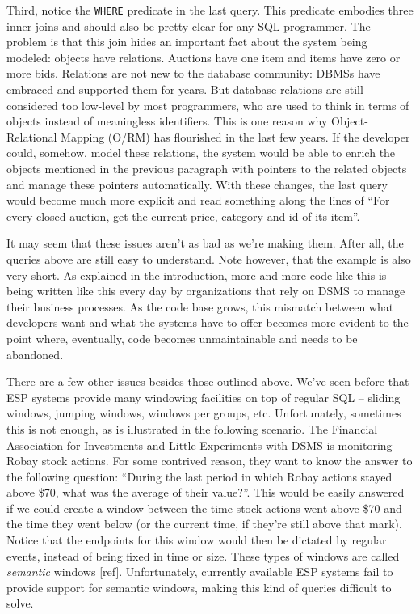 \documentclass{report}
\begin{document}
Third, notice the \verb=WHERE= predicate in the last query. This
predicate embodies three inner joins and should also be pretty clear
for any SQL programmer. The problem is that this join hides an
important fact about the system being modeled: objects have
relations. Auctions have one item and items have zero or more
bids. Relations are not new to the database community: DBMSs have
embraced and supported them for years. But database relations are
still considered too low-level by most programmers, who are used to
think in terms of objects instead of meaningless identifiers. This is
one reason why Object-Relational Mapping (O/RM) has flourished in the
last few years. If the developer could, somehow, model these
relations, the system would be able to enrich the objects mentioned in
the previous paragraph with pointers to the related objects and manage
these pointers automatically. With these changes, the last query would
become much more explicit and read something along the lines of ``For
every closed auction, get the current price, category and id of its
item''.

It may seem that these issues aren't as bad as we're making
them. After all, the queries above are still easy to understand. Note
however, that the example is also very short. As explained in the
introduction, more and more code like this is being written like this
every day by organizations that rely on DSMS to manage their business
processes. As the code base grows, this mismatch between what
developers want and what the systems have to offer becomes more
evident to the point where, eventually, code becomes unmaintainable
and needs to be abandoned.

There are a few other issues besides those outlined above. We've seen
before that ESP systems provide many windowing facilities on top of
regular SQL -- sliding windows, jumping windows, windows per groups,
etc. Unfortunately, sometimes this is not enough, as is illustrated in
the following scenario. The Financial Association for Investments and
Little Experiments with DSMS is monitoring Robay stock actions. For
some contrived reason, they want to know the answer to the following
question: ``During the last period in which Robay actions stayed above
\$70, what was the average of their value?''. This would be easily
answered if we could create a window between the time stock actions
went above \$70 and the time they went below (or the current time, if
they're still above that mark). Notice that the endpoints for this
window would then be dictated by regular events, instead of being
fixed in time or size. These types of windows are called
\emph{semantic} windows [ref]. Unfortunately, currently available ESP
systems fail to provide support for semantic windows, making this kind
of queries difficult to solve.
\end{document}
